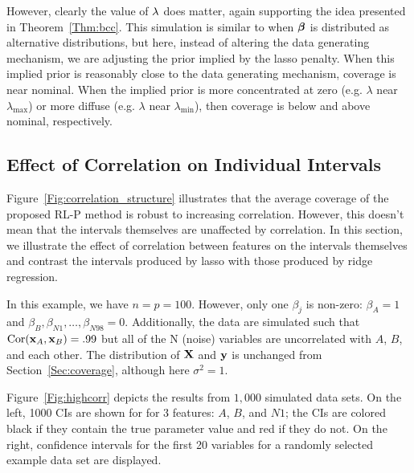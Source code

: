 However, clearly the value of $\lambda$ does matter, again supporting the idea presented in Theorem~\ref{Thm:bcc}. This simulation is similar to when $\boldsymbol{\beta}$ is distributed as alternative distributions, but here, instead of altering the data generating mechanism, we are adjusting the prior implied by the lasso penalty. When this implied prior is reasonably close to the data generating mechanism, coverage is near nominal. When the implied prior is more concentrated at zero (e.g. $\lambda$ near $\lambda_{\max}$) or more diffuse (e.g. $\lambda$ near $\lambda_{\min}$), then coverage is below and above nominal, respectively.

\subsection{Effect of Correlation on Individual Intervals} \label{Sec:Ridge}

Figure~\ref{Fig:correlation_structure} illustrates that the average coverage of the proposed RL-P method is robust to increasing correlation. However, this doesn't mean that the intervals themselves are unaffected by correlation. In this section, we illustrate the effect of correlation between features on the intervals themselves and contrast the intervals produced by lasso with those produced by ridge regression.

In this example, we have $n = p = 100$. However, only one $\beta_j$ is non-zero: $\beta_{A} = 1$ and $\beta_{B}, \beta_{N1}, \ldots, \beta_{N98} = 0$. Additionally, the data are simulated such that $\textrm{Cor}(\mathbf{x}_{A}, \mathbf{x}_{B}) = .99$ but all of the N (noise) variables are uncorrelated with $A$, $B$, and each other. The distribution of $\mathbf{X}$ and $\mathbf{y}$ is unchanged from Section~\ref{Sec:coverage}, although here $\sigma^2 = 1$.

Figure~\ref{Fig:highcorr} depicts the results from $1,000$ simulated data sets. On the left, 1000 CIs are shown for for 3 features: $A$, $B$, and $N1$; the CIs are colored black if they contain the true parameter value and red if they do not. On the right, confidence intervals for the first 20 variables for a randomly selected example data set are displayed.

